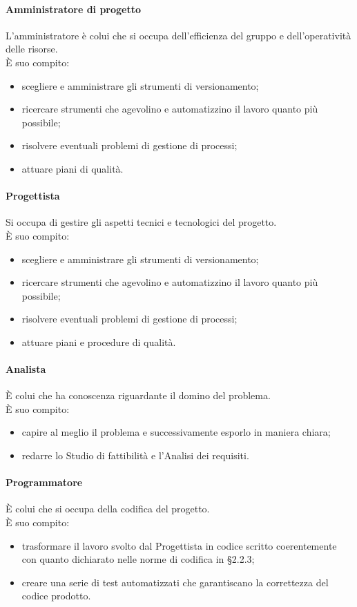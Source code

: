 \documentclass[11pt,a4paper]{article}
\begin{document}
{	\paragraph{Amministratore di progetto}
	L'amministratore è colui che si occupa dell'efficienza del gruppo e dell'operatività delle risorse.\\
	È suo compito:
	\begin{itemize}
		\item{scegliere e amministrare gli strumenti di versionamento;}
		\item{ricercare strumenti che agevolino e automatizzino il lavoro quanto più possibile;}
		\item{risolvere eventuali problemi di gestione di processi;}
		\item{attuare piani  di qualità.}
	\end{itemize}
	\paragraph{Progettista}
	Si occupa di gestire gli aspetti tecnici e tecnologici del progetto.\\
	È suo compito:
	\begin{itemize}
		\item{scegliere e amministrare gli strumenti di versionamento;}
		\item{ricercare strumenti che agevolino e automatizzino il lavoro quanto più possibile;}
		\item{risolvere eventuali problemi di gestione di processi;}
		\item{attuare piani e procedure di qualità.}
	\end{itemize}
	\paragraph{Analista}
	È colui che ha conoscenza riguardante il domino del problema.\\
	È suo compito:
	\begin{itemize}
		\item{capire al meglio il problema e successivamente esporlo in maniera chiara;}
		\item{redarre lo Studio di fattibilità e l'Analisi dei requisiti.}
	\end{itemize}
	\paragraph{Programmatore}
	È colui che si occupa della codifica del progetto.\\
	È suo compito:
	\begin{itemize}
		\item{trasformare il lavoro svolto dal Progettista in codice scritto coerentemente con quanto dichiarato nelle norme di codifica in \S2.2.3;}
		\item{creare una serie di test automatizzati che garantiscano la correttezza del codice prodotto.}
	\end{itemize}
}
\end{document}
